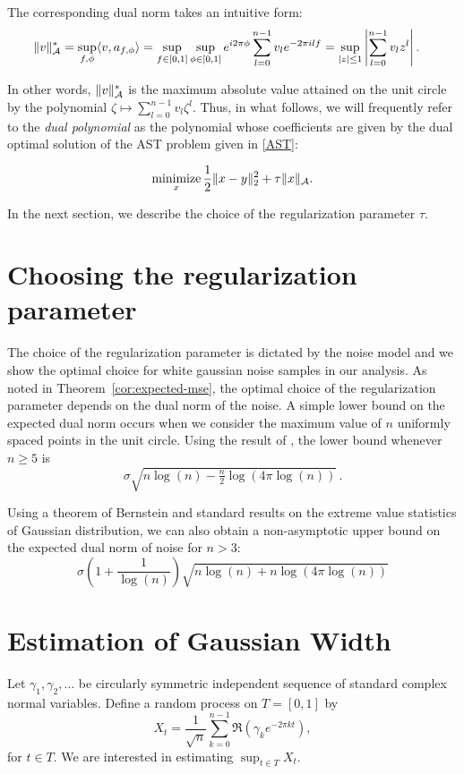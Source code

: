 The corresponding dual norm takes an intuitive form:
\begin{align}
	\|v\|_{\mathcal{A}}^* &= \sup_{{f,\phi}} \langle v, a_{f,\phi} \rangle=\sup_{f\in [0,1]}  \sup_{\phi \in [0,1]}  e^{i 2\pi \phi} \sum_{l=0}^{n-1} v_l e^{-2\pi i l f} =\sup_{ |z|\leq 1 }  \left| \sum_{l=0}^{n-1} v_l z^l\right|.\label{eq:dual-norm-poly}
\end{align}

In other words, $\|v\|_{\mathcal{A}}^*$ is the maximum absolute value attained on the
unit circle by the polynomial $\zeta \mapsto \sum_{l=0}^{n-1} v_l \zeta^l$.
Thus, in what follows, we will frequently refer to the \emph{dual polynomial} as
the polynomial whose coefficients are given by the dual optimal solution of the
AST problem given in \eqref{AST}:

\begin{equation}
\mathop{\textrm{minimize}}_x \frac{1}{2} \lVert x - y\rVert_2^2 + \tau \lVert x\rVert_{\mathcal{A}}.
\end{equation}

In the next section, we describe the choice of the regularization parameter
$\tau$.

\section{Choosing the regularization parameter}\label{subsec:parameter}
The choice of the regularization parameter is dictated by the noise model and
we show the optimal choice for white gaussian noise samples in our analysis. As
noted in Theorem~\ref{cor:expected-mse}, the optimal choice of the
regularization parameter depends on the dual norm of the noise.  A simple
lower bound on the expected dual norm occurs when we consider the maximum
value of $n$ uniformly spaced points in the unit circle. Using the result of
\cite{lr76}, the lower bound whenever $n \geq 5$ is
\[
\sigma\sqrt{n\log(n) - \tfrac{n}{2} \log(4\pi\log(n))}\,.
\]

Using a theorem of Bernstein and standard results on the extreme value
statistics of Gaussian distribution, we can also obtain a non-asymptotic upper
bound on the expected dual norm of noise for $n > 3$:
\[\sigma\left(1  + \frac{1}{\log(n)}\right)\sqrt{n \log(n) + n\log( 4\pi \log(n))}\nonumber
\]


\section{Estimation of Gaussian Width}
\label{gw}
Let $\gamma_1, \gamma_2, \ldots$ be circularly symmetric independent sequence of standard complex normal variables. Define a random process on $T = [0,1]$ by
\begin{equation}
\label{ranproc}
X_t = \frac{1}{\sqrt{n}}\sum_{k=0}^{n-1}\Re(\gamma_k e^{-2\pi k t}),
\end{equation}
for $t \in T$. We are interested in estimating $\sup_{t \in T} {X_t}$.

